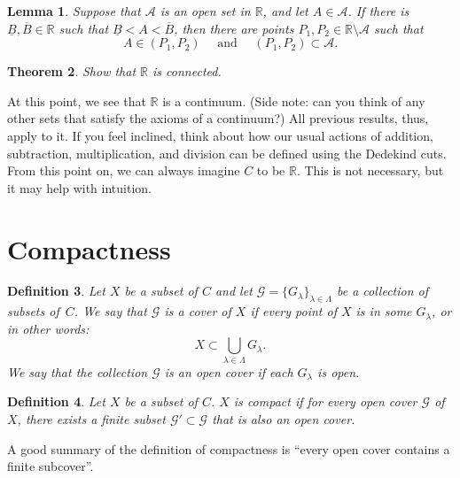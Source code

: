 \documentclass{amsart}
\newtheorem{theorem}{Theorem}
\newtheorem{lemma}[theorem]{Lemma}
\newtheorem{definition}[theorem]{Definition}
\newcommand{\R}{\mathbb R}
\newcommand{\1}{\mathds{1}}
\newcommand{\cA}{\mathcal A}
\def \R {{\mathbb {R}}}
\numberwithin{equation}{section}
\numberwithin{theorem}{section}
\begin{document}
\begin{lemma}
Suppose that $\cA$ is an open set in $\R$, and let $A \in \cA$.  If there is $\underline B, \overline B \in \R$ such that $\underline B < A < \overline B$, then there are points $P_1, P_2 \in \R\setminus \cA$ such that
\[
	A \in (P_1, P_2)
		\quad\text{ and }\quad
	(P_1, P_2) \subset \cA.
\]
\end{lemma}




\begin{theorem}
	Show that $\R$ is connected.
\end{theorem}




At this point, we see that $\R$ is a continuum.  (Side note: can you think of any other sets that satisfy the axioms of a continuum?)  All previous results, thus, apply to it.  If you feel inclined, think about how our usual actions of addition, subtraction, multiplication, and division can be defined using the Dedekind cuts.  From this point on, we can always imagine $C$ to be $\R$.  This is not necessary, but it may help with intuition.










\section{Compactness}



\begin{definition}  Let $X$ be a subset of $C$ and let $\mathcal{G} = \{ G_{\lambda} \}_{\lambda \in \Lambda}$ be a collection of subsets of~$C$.  We say that $\mathcal{G}$ is a \emph{cover} of $X$ if every point of $X$ is in some $G_{\lambda}$, or in other words:
\[
X \subset \bigcup_{\lambda \in \Lambda} G_{\lambda}.
\]
We say that the collection $\mathcal{G}$ is an \emph{open cover} if each $G_{\lambda}$ is open.
\end{definition}

\begin{definition}  Let $X$ be a subset of $C$.  $X$ is \emph{compact} if for every open cover $\mathcal{G}$ of $X$, there exists a finite subset $\mathcal{G}' \subset \mathcal{G}$ that is also an open cover.
\end{definition}

\noindent  A good summary of the definition of compactness is ``every open cover contains a finite subcover''.
\end{document}
